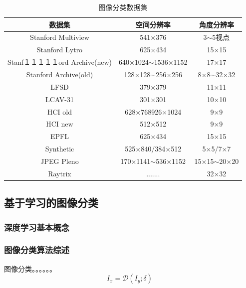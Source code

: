 \documentclass[UTF8,a4paper,11pt]{ctexart}
\begin{document}
\begin{sloppypar}
	\begin{table}[h]
		\centering
		\footnotesize
		\caption{图像分类数据集}
		\vspace{10pt}
		\begin{tabular}{ccc}
			\hline
			数据集                   & 空间分辨率          &角度分辨率            \\ \hline
			Stanford Multiview    & 541×376                 & 3$\sim$5视点       \\
			Stanford Lytro        & 625×434                 & 15×15            \\
			Stanf１１１１１ord Archive(new) & 640×1024$\sim$1536×1152 & 17×17            \\ 
			Stanford Archive(old) & 128×128$\sim$256×256    & 8×8$\sim$32×32   \\
			LFSD                  & 379×379                 & 11×11            \\
			LCAV-31               & 301×301                 & 10×10            \\
			HCI old              & 628×768926×1024         & 9×9              \\
			HCI new              & 512×512                 & 9×9              \\
			EPFL                  & 625×434                 & 15×15            \\
			Synthetic             & 525×840/384×512         & 5×5/7×7          \\
			JPEG Pleno            & 170×1141$\sim$536×1152  & 15×15$\sim$20×20 \\
			Raytrix               & .......                & 32×32            \\ \hline
		\end{tabular}
		\label{bs5}
	\end{table}
	
	\subsection{基于学习的图像分类}
	\subsubsection{深度学习基本概念}
	
	
	\subsubsection{图像分类算法综述}
	图像分类。。。。。。
	\begin{equation}
		I_x = \mathcal{D}(I_y;\delta)
	\end{equation}
	


\end{sloppypar}
\end{document}
